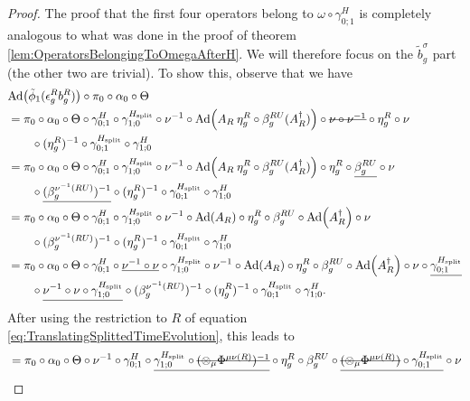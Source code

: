 \documentclass[11pt,a4paper,twoside]{article}
\numberwithin{equation}{section}
\begin{document}
	\begin{proof}
		The proof that the first four operators belong to $\omega\circ\gamma^H_{0;1}$ is completely analogous to what was done in the proof of theorem \ref{lem:OperatorsBelongingToOmegaAfterH}. We will therefore focus on the $\tilde{b}_g^\sigma$ part (the other two are trivial). To show this, observe that we have
		\begin{align}
			&\Ad{\phiTilde_1(\epsilon_g^R b_g^R)}\circ\pi_0\circ\alpha_0\circ\Theta\\
			&=\pi_0\circ\alpha_0\circ\Theta\circ\gamma^H_{0;1}\circ\gamma^{\Hsplit}_{1;0}\circ\nu^{-1}\circ\Ad{A_R\: \eta_g^R\circ\beta_g^{RU}(A_R^\dagger)}\circ\stkout{\nu\circ\nu^{-1}}\circ\eta_g^R\circ\nu\\
			\nonumber
			&\qquad\circ(\eta_g^R)^{-1}\circ\gamma^{\Hsplit}_{0;1}\circ\gamma^{H}_{1;0}\\
			&=\pi_0\circ\alpha_0\circ\Theta\circ\gamma^H_{0;1}\circ\gamma^{\Hsplit}_{1;0}\circ\nu^{-1}\circ\Ad{A_R\: \eta_g^R\circ\beta_g^{RU}(A_R^\dagger)}\circ\eta_g^R\circ\underline{\beta_g^{RU}}\circ\nu\\
			\nonumber
			&\qquad\circ\underline{(\beta_g^{\nu^{-1}(RU)})^{-1}}\circ(\eta_g^R)^{-1}\circ\gamma^{\Hsplit}_{0;1}\circ\gamma^{H}_{1;0}\\
			&=\pi_0\circ\alpha_0\circ\Theta\circ\gamma^H_{0;1}\circ\gamma^{\Hsplit}_{1;0}\circ\nu^{-1}\circ\Ad{A_R}\circ\eta_g^R\circ\beta_g^{RU}\circ\Ad{A_R^\dagger}\circ\nu\\
			\nonumber
			&\qquad\circ(\beta_g^{\nu^{-1}(RU)})^{-1}\circ(\eta_g^R)^{-1}\circ\gamma^{\Hsplit}_{0;1}\circ\gamma^{H}_{1;0}\\
			&=\pi_0\circ\alpha_0\circ\Theta\circ\gamma^H_{0;1}\circ\underline{\nu^{-1}\circ\nu}\circ\gamma^{\Hsplit}_{1;0}\circ\nu^{-1}\circ\Ad{A_R}\circ\eta_g^R\circ\beta_g^{RU}\circ\Ad{A_R^\dagger}\circ\nu\circ\underline{\gamma^{\Hsplit}_{0;1}}\\
			\nonumber
			&\qquad \circ\underline{\nu^{-1}\circ\nu\circ\gamma^{\Hsplit}_{1;0}}\circ(\beta_g^{\nu^{-1}(RU)})^{-1}\circ(\eta_g^R)^{-1}\circ\gamma^{\Hsplit}_{0;1}\circ\gamma^{H}_{1;0}.
		\end{align}
		After using the restriction to $R$ of equation \eqref{eq:TranslatingSplittedTimeEvolution}, this leads to
		\begin{align}
			&=\pi_0\circ\alpha_0\circ\Theta\circ\nu^{-1}\circ\gamma^H_{0;1}\circ\underline{\gamma^{\Hsplit}_{1;0}\circ\stkout{(\otimes_\mu\Phi^{\mu\nu(R)})^{-1}}}\circ\eta_g^R\circ\beta_g^{RU}\circ\underline{\stkout{(\otimes_\mu\Phi^{\mu\nu(R)})}\circ\gamma^{\Hsplit}_{0;1}}\circ\nu\\

\end{align}
\end{proof}
\end{document}
